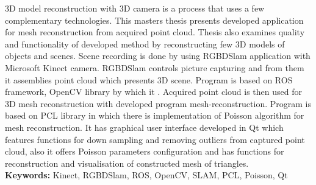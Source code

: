 3D model reconstruction with 3D camera is a process that uses a few
complementary technologies. This masters thesis presents developed
application for mesh reconstruction from acquired point cloud. Thesis
also examines quality and functionality of developed method by
reconstructing few 3D models of objects and scenes. Scene recording is
done by using RGBDSlam application with Microsoft Kinect camera.
RGBDSlam controls picture capturing and from them it assemblies point
cloud which presents 3D scene. Program is based on ROS framework, 
OpenCV library by which it . Acquired point cloud is then used for 3D mesh
reconstruction with developed program mesh-reconstruction. Program is
based on PCL library in which there is implementation of Poisson
algorithm for mesh reconstruction. It has graphical user interface
developed in Qt which features functions for down sampling and removing
outliers from captured point cloud, also it offers Poisson parameters
configuration and has functions for reconstruction and visualisation of
constructed mesh of triangles.
\\

\noindent\textbf{Keywords:} Kinect, RGBDSlam, ROS, OpenCV, SLAM, PCL,
Poisson, Qt


